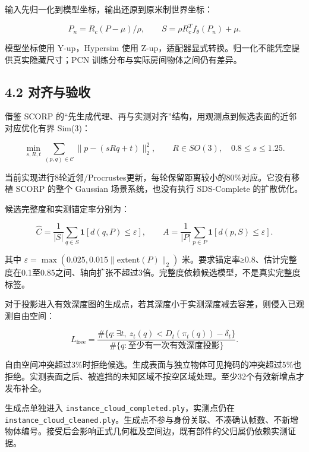 \documentclass[UTF8,fontset=fandol]{ctexart}
\begin{document}
输入先归一化到模型坐标，输出还原到原米制世界坐标：



\[
P_n=R_c(P-\mu)/\rho,\qquad
S=\rho R_c^Tf_\theta(P_n)+\mu.
\]

模型坐标使用 Y-up，Hypersim 使用 Z-up，适配器显式转换。归一化不能凭空提供真实隐藏尺寸；PCN 训练分布与实际房间物体之间仍有差异。



\subsection*{4.2 对齐与验收}

借鉴 SCORP 的“先生成代理、再与实测对齐”结构，用观测点到候选表面的近邻对应优化有界 Sim(3)：



\[
\min_{s,R,t}\sum_{(p,q)\in\mathcal C}\|p-(sRq+t)\|_2^2,
\qquad R\in SO(3),\quad 0.8\le s\le1.25.
\]

当前实现进行8轮近邻/Procrustes更新，每轮保留距离较小的80\%对应。它没有移植 SCORP 的整个 Gaussian 场景系统，也没有执行 SDS-Complete 的扩散优化。



候选完整度和实测锚定率分别为：



\[
\widehat C=\frac{1}{|S|}\sum_{q\in S}\mathbf1[d(q,P)\le\varepsilon],\qquad
A=\frac{1}{|P|}\sum_{p\in P}\mathbf1[d(p,S)\le\varepsilon].
\]

其中 $\varepsilon=\max(0.025,0.015\|\mathrm{extent}(P)\|_2)$ 米。要求锚定率≥0.8、估计完整度在0.1至0.85之间、轴向扩张不超过3倍。完整度依赖候选模型，不是真实完整度标签。



对于投影进入有效深度图的生成点，若其深度小于实测深度减去容差，则侵入已观测自由空间：



\[
L_{\mathrm{free}}=\frac{\#\{q:\exists t,\ z_t(q)<D_t(\pi_t(q))-\delta_t\}}{\#\{q:\text{至少有一次有效深度投影}\}}.
\]

自由空间冲突超过3\%时拒绝候选。生成表面与独立物体可见掩码的冲突超过5\%也拒绝。实测表面之后、被遮挡的未知区域不按空区域处理。至少32个有效新增点才发布补全。



生成点单独进入 \texttt{instance\_\allowbreak{}cloud\_\allowbreak{}completed.\allowbreak{}ply}，实测点仍在 \texttt{instance\_\allowbreak{}cloud\_\allowbreak{}cleaned.\allowbreak{}ply}。生成点不参与身份关联、不凑确认帧数、不新增物体编号。接受后会影响正式几何框及空间边，既有部件的父归属仍依赖实测证据。
\end{document}
